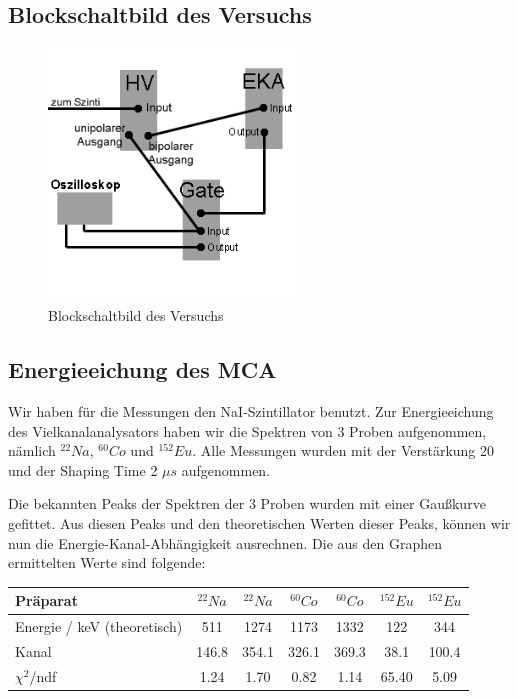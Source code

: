 \subsection{Blockschaltbild des Versuchs}

\begin{figure}[H]
\centering \includegraphics[width = 0.6\textwidth]{Bilder/Schema.png}
\caption{Blockschaltbild des Versuchs}
\end{figure}

\subsection{Energieeichung des MCA}

Wir haben für die Messungen den NaI-Szintillator benutzt. Zur Energieeichung des Vielkanalanalysators haben wir die Spektren von 3 Proben aufgenommen, nämlich $^{22}Na$, $^{60}Co$ und $^{152}Eu$. Alle Messungen wurden mit der Verstärkung 20 und der Shaping Time 2 $\mu s$ aufgenommen.

Die bekannten Peaks der Spektren der 3 Proben wurden mit einer Gaußkurve gefittet. Aus diesen Peaks und den theoretischen Werten dieser Peaks, können wir nun die Energie-Kanal-Abhängigkeit ausrechnen. Die aus den Graphen ermittelten Werte sind folgende:\\

\begin{center}
\begin{tabular}{| l | c | c | c | c | c | c |} \hline
Präparat & $^{22}Na$ & $^{22}Na$ & $^{60}Co$ & $^{60}Co$ & $^{152}Eu$ & $^{152}Eu$\\ \hline
Energie / keV (theoretisch) & 511 & 1274 & 1173 & 1332 & 122 & 344\\ \hline
Kanal & 146.8 & 354.1 & 326.1 & 369.3 & 38.1 & 100.4\\ \hline
$\chi^2$/ndf & 1.24 & 1.70 & 0.82 & 1.14 & 65.40 & 5.09\\ \hline
\end{tabular}
\end{center}

